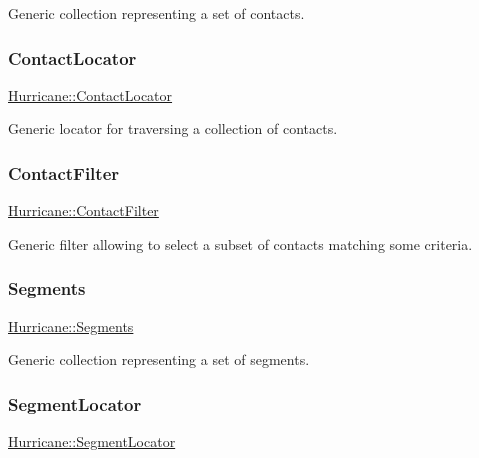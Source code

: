 Generic collection representing a set of contacts. \mbox{\label{namespaceHurricane_a244811a7f36de747884f0c1ab1cc1025}} 
\subsubsection{\texorpdfstring{Contact\+Locator}{ContactLocator}}
{\footnotesize\ttfamily \mbox{\hyperlink{namespaceHurricane_a244811a7f36de747884f0c1ab1cc1025}{Hurricane\+::\+Contact\+Locator}}}

Generic locator for traversing a collection of contacts. \mbox{\label{namespaceHurricane_a57f79232601d8739370debec00f89740}} 
\subsubsection{\texorpdfstring{Contact\+Filter}{ContactFilter}}
{\footnotesize\ttfamily \mbox{\hyperlink{namespaceHurricane_a57f79232601d8739370debec00f89740}{Hurricane\+::\+Contact\+Filter}}}

Generic filter allowing to select a subset of contacts matching some criteria. \mbox{\label{namespaceHurricane_a30748fa53a81cb597d4a13d651238716}} 
\subsubsection{\texorpdfstring{Segments}{Segments}}
{\footnotesize\ttfamily \mbox{\hyperlink{namespaceHurricane_a30748fa53a81cb597d4a13d651238716}{Hurricane\+::\+Segments}}}

Generic collection representing a set of segments. \mbox{\label{namespaceHurricane_a37c8302c278e8c1c60c6ffc0222ec4c8}} 
\subsubsection{\texorpdfstring{Segment\+Locator}{SegmentLocator}}
{\footnotesize\ttfamily \mbox{\hyperlink{namespaceHurricane_a37c8302c278e8c1c60c6ffc0222ec4c8}{Hurricane\+::\+Segment\+Locator}}}

